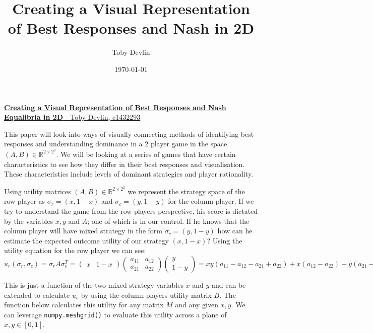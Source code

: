 \documentclass[9pt]{report}
\title{Creating a Visual Representation of Best Responses and Nash  in 2D}
\author{Toby Devlin}
\date{\today}
\begin{document}
    \begin{center}
        \underline{\textbf{Creating a Visual Representation of Best Responses and Nash Equalibria in 2D} - Toby Devlin, c1432293}
    \end{center}
     This paper will look into ways of visually connecting methods of identifying best responses and understanding dominance in a 2 player game in the space $(A, B)\in \mathbb{R}^{2 \times 2 ^2}$. We will be looking at a series of games that have certain characteristics to see how they differ in their best responses and visualisation. These characteristics include levels of dominant strategies and player rationality. 

    Using utility matrices $(A,B)\in \mathbb{R}^{2 \times 2 ^2}$ we represent the strategy space of the row player as $\sigma_{r} = (x,1-x)$ and $\sigma_{c} = (y,1-y)$ for the column player. If we try to understand the game from the row players perspective, his score is dictated by the variables $x,y$ and $A$; one of which is in our control. If he knows that the column player will have mixed strategy in the form $\sigma_{c} = (y,1-y)$ how can he estimate the expected outcome utility of our strategy $(x,1-x)$? Using the utility equation for the row player we can see:
    $$u_{r}(\sigma_{r},\sigma_{c}) = \sigma_{r} A \sigma_{c}^T =
        \begin{pmatrix}
        x & 1-x
        \end{pmatrix} 
        \begin{pmatrix}
        a_{11} & a_{12} \\
        a_{21} & a_{22}
        \end{pmatrix} 
        \begin{pmatrix}
        y\\
        1-y
        \end{pmatrix} =
        xy(a_{11} - a_{12} - a_{21}+a_{22})+x(a_{12}-a_{22})+y(a_{21}-a_{22})+a_{22} = f(x,y,A)$$
        
    This is just a function of the two mixed strategy variables $x$ and $y$ and can be extended to calculate $u_c$ by using the column players utility matrix $B$. The function below calculates this utility for any matrix $M$ and any given $x,y$. We can leverage \texttt{numpy.meshgrid()} to evaluate this utility across a plane of $x,y\in [0,1]$.   
    \begin{figure}[h]
        \inputminted{python}{./code/get_utility_plane.py}
    \end{figure}
\end{document}
